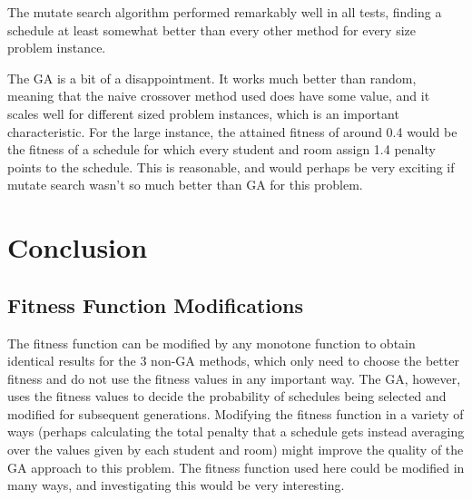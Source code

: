 \documentclass[letterpaper]{article}
\begin{document}
	The mutate search algorithm performed remarkably well in all tests, finding a 
	schedule at least somewhat better than every other method for every size problem 
	instance.
	
	The GA is a bit of a disappointment. It works much better than random, meaning 
	that the naive crossover method used does have some value, and it scales well 
	for different sized problem instances, which is an important characteristic. 
	For the large instance, the attained fitness of around 0.4 would be the fitness 
	of a schedule for which every student and room assign 1.4 penalty points to the 
	schedule. This is reasonable, and would perhaps be very exciting if mutate search 
	wasn't so much better than GA for this problem.
  
\section{Conclusion}
  \subsection{Fitness Function Modifications}
    The fitness function can be modified by any monotone function to obtain identical 
    results for the 3 non-GA methods, which only need to choose the better fitness 
    and do not use the fitness values in any important way. The GA, however, uses the 
    fitness values to decide the probability of schedules being selected and modified 
    for subsequent generations. Modifying the fitness function in a variety of ways 
    (perhaps calculating the total penalty that a schedule gets instead averaging over 
    the values given by each student and room) might improve the quality of the GA 
    approach to this problem. The fitness function used here could be modified in many 
    ways, and investigating this would be very interesting.
  
\nocite{*}


\end{document}
